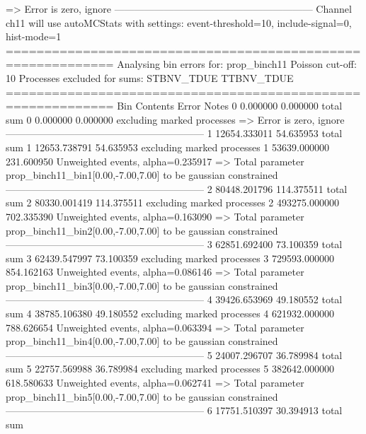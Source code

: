   => Error is zero, ignore      
------------------------------------------------------------
Channel ch11 will use autoMCStats with settings: event-threshold=10, include-signal=0, hist-mode=1
============================================================
Analysing bin errors for: prop_binch11
Poisson cut-off: 10
Processes excluded for sums: STBNV_TDUE TTBNV_TDUE
============================================================
Bin        Contents        Error           Notes                         
0          0.000000        0.000000        total sum                     
0          0.000000        0.000000        excluding marked processes    
  => Error is zero, ignore      
------------------------------------------------------------
1          12654.333011    54.635953       total sum                     
1          12653.738791    54.635953       excluding marked processes    
1          53639.000000    231.600950      Unweighted events, alpha=0.235917
  => Total parameter prop_binch11_bin1[0.00,-7.00,7.00] to be gaussian constrained
------------------------------------------------------------
2          80448.201796    114.375511      total sum                     
2          80330.001419    114.375511      excluding marked processes    
2          493275.000000   702.335390      Unweighted events, alpha=0.163090
  => Total parameter prop_binch11_bin2[0.00,-7.00,7.00] to be gaussian constrained
------------------------------------------------------------
3          62851.692400    73.100359       total sum                     
3          62439.547997    73.100359       excluding marked processes    
3          729593.000000   854.162163      Unweighted events, alpha=0.086146
  => Total parameter prop_binch11_bin3[0.00,-7.00,7.00] to be gaussian constrained
------------------------------------------------------------
4          39426.653969    49.180552       total sum                     
4          38785.106380    49.180552       excluding marked processes    
4          621932.000000   788.626654      Unweighted events, alpha=0.063394
  => Total parameter prop_binch11_bin4[0.00,-7.00,7.00] to be gaussian constrained
------------------------------------------------------------
5          24007.296707    36.789984       total sum                     
5          22757.569988    36.789984       excluding marked processes    
5          382642.000000   618.580633      Unweighted events, alpha=0.062741
  => Total parameter prop_binch11_bin5[0.00,-7.00,7.00] to be gaussian constrained
------------------------------------------------------------
6          17751.510397    30.394913       total sum                     
